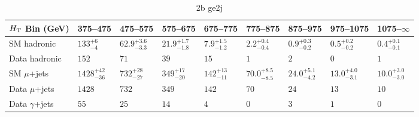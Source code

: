 \documentclass[8pt]{article}
\def\scalht{\mbox{$H_{\rm{T}}$}\xspace}
\newcommand\T{\rule{0pt}{2.6ex}}
\newcommand\B{\rule[-1.2ex]{0pt}{0pt}}
\begin{document}
\begin{table}[ht!]
\caption{2b ge2j}
\label{tab:ensemble-2b ge2j}
\centering
\begin{tabular}{ lllllllll }

\hline
\scalht Bin (GeV)       & 375--475                       & 475--575                       & 575--675                       & 675--775                       & 775--875                       & 875--975                       & 975--1075                      & 1075--$\infty$                 \\ [1.000000ex]
\hline
SM hadronic\T           & $133^{+6}_{-4}$                & $62.9^{+3.6}_{-3.3}$           & $21.9^{+1.7}_{-1.8}$           & $7.9^{+1.5}_{-1.2}$            & $2.2^{+0.4}_{-0.4}$            & $0.9^{+0.3}_{-0.2}$            & $0.5^{+0.2}_{-0.2}$            & $0.4^{+0.1}_{-0.1}$            \\ 
Data hadronic\B         & $152$                          & $71$                           & $39$                           & $15$                           & $1$                            & $2$                            & $0$                            & $1$                            \\ 
\hline
SM $\mu$+jets\T         & $1428^{+42}_{-36}$             & $732^{+28}_{-27}$              & $349^{+17}_{-20}$              & $142^{+13}_{-11}$              & $70.0^{+8.5}_{-8.5}$           & $24.0^{+5.1}_{-4.2}$           & $13.0^{+4.0}_{-3.1}$           & $10.0^{+3.0}_{-3.0}$           \\ 
Data $\mu$+jets\B       & $1428$                         & $732$                          & $349$                          & $142$                          & $70$                           & $24$                           & $13$                           & $10$                           \\ 
\hline
Data $\gamma$+jets\B    & $55$                           & $25$                           & $14$                           & $4$                            & $0$                            & $3$                            & $1$                            & $0$                            \\ 
\hline

\end{tabular}
\end{table}
\end{document}

